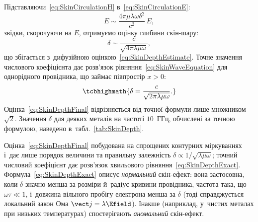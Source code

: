 
Підставляючи~\eqref{eq:SkinCirculationH} в~\eqref{eq:SkinCirculationE}:
\begin{equation*}
	E \sim \frac{4\pi\mu\lambda\omega\delta^2}{c^2}\, E,
\end{equation*}
звідки, скорочуючи на $E$, отримуємо оцінку глибини скін-шару:
\begin{equation}\label{eq:SkinDepthFinal}
	\delta \sim \frac{c}{\sqrt{4\pi\lambda\mu\omega}},
\end{equation}
що збігається з~дифузійною оцінкою~\eqref{eq:SkinDepthEstimate}. Точне значення числового
коефіцієнта дає розв'язок рівняння~\eqref{eq:SkinWaveEquation} для однорідного провідника,
що займає півпростір $x>0$:
\begin{equation}\label{eq:SkinDepthExact}
	\tcbhighmath{
		\delta = \frac{c}{\sqrt{2\pi\lambda\mu\omega}}.
	}
\end{equation}
Оцінка~\eqref{eq:SkinDepthFinal} відрізняється від точної формули лише множником $\sqrt2$.
Значення $\delta$ для деяких металів на частоті $10$~ГГц, обчислені за точною формулою,
наведено в~табл.~\ref{tab:SkinDepth}.

\begin{Attention}
	Оцінка~\eqref{eq:SkinDepthFinal} побудована на спрощених контурних міркуваннях і~дає
	лише порядок величини та правильну залежність
	$\delta\propto1/\sqrt{\lambda\mu\omega}$; точний числовий коефіцієнт дає розв'язок
	хвильового рівняння~\eqref{eq:SkinDepthExact}. Формула~\eqref{eq:SkinDepthExact}
	описує \emph{нормальний} скін-ефект: вона застосовна, коли $\delta$ значно менша за
	розміри й~радіус кривини провідника, частота така, що $\omega\tau\ll1$, і~довжина
	вільного пробігу електрона менша за $\delta$ (тоді справджується локальний закон Ома
	$\vect j=\lambda\Efield$). Інакше (наприклад, у~чистих металах при низьких
	температурах) спостерігають \emph{аномальний} скін-ефект.
\end{Attention}

